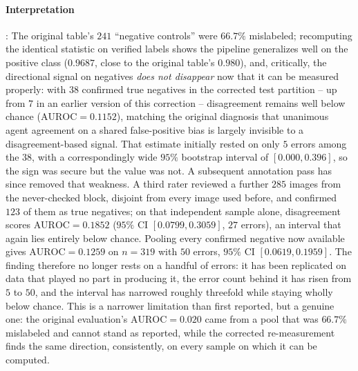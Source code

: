 \documentclass[12pt,a4paper]{report}
\begin{document}
\paragraph{Interpretation}: The original table's $241$ ``negative controls'' were $66.7\%$ mislabeled; recomputing the identical statistic on verified labels shows the pipeline generalizes well on the positive class ($0.9687$, close to the original table's $0.980$), and, critically, the directional signal on negatives \emph{does not disappear} now that it can be measured properly: with $38$ confirmed true negatives in the corrected test partition -- up from $7$ in an earlier version of this correction -- disagreement remains well below chance ($\text{AUROC}=0.1152$), matching the original diagnosis that unanimous agent agreement on a shared false-positive bias is largely invisible to a disagreement-based signal. That estimate initially rested on only $5$ errors among the $38$, with a correspondingly wide $95\%$ bootstrap interval of $[0.000, 0.396]$, so the sign was secure but the value was not. A subsequent annotation pass has since removed that weakness. A third rater reviewed a further $285$ images from the never-checked block, disjoint from every image used before, and confirmed $123$ of them as true negatives; on that independent sample alone, disagreement scores $\text{AUROC}=0.1852$ ($95\%$ CI $[0.0799, 0.3059]$, $27$ errors), an interval that again lies entirely below chance. Pooling every confirmed negative now available gives $\text{AUROC}=0.1259$ on $n=319$ with $50$ errors, $95\%$ CI $[0.0619, 0.1959]$. The finding therefore no longer rests on a handful of errors: it has been replicated on data that played no part in producing it, the error count behind it has risen from $5$ to $50$, and the interval has narrowed roughly threefold while staying wholly below chance. This is a narrower limitation than first reported, but a genuine one: the original evaluation's $\text{AUROC}=0.020$ came from a pool that was $66.7\%$ mislabeled and cannot stand as reported, while the corrected re-measurement finds the same direction, consistently, on every sample on which it can be computed.
\end{document}
